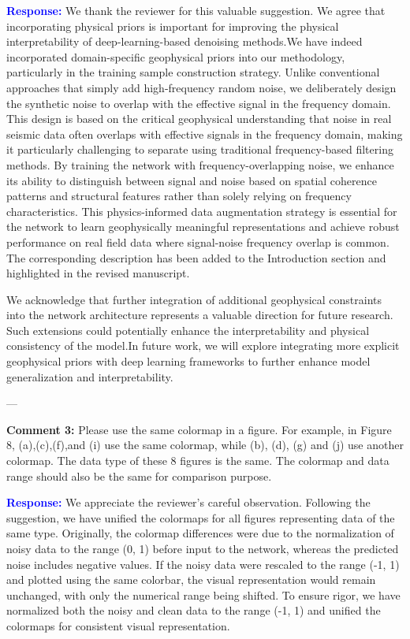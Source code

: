 \documentclass[12pt]{article}
\begin{document}
\textcolor{blue}{\textbf{Response:}}  
We thank the reviewer for this valuable suggestion. We agree that incorporating physical priors is important for improving the physical interpretability of deep-learning-based denoising methods.We have indeed incorporated domain-specific geophysical priors into our methodology, particularly in the training sample construction strategy. Unlike conventional approaches that simply add high-frequency random noise, we deliberately design the synthetic noise to overlap with the effective signal in the frequency domain. This design is based on the critical geophysical understanding that noise in real seismic data often overlaps with effective signals in the frequency domain, making it particularly challenging to separate using traditional frequency-based filtering methods. By training the network with frequency-overlapping noise, we enhance its ability to distinguish between signal and noise based on spatial coherence patterns and structural features rather than solely relying on frequency characteristics. This physics-informed data augmentation strategy is essential for the network to learn geophysically meaningful representations and achieve robust performance on real field data where signal-noise frequency overlap is common. The corresponding description has been added to the Introduction section and highlighted in the revised manuscript.

We acknowledge that further integration of additional geophysical constraints into the network architecture represents a valuable direction for future research. Such extensions could potentially enhance the interpretability and physical consistency of the model.In future work, we will explore integrating more explicit geophysical priors with deep learning frameworks to further enhance model generalization and interpretability.

---

\textbf{Comment 3:}  
Please use the same colormap in a figure. For example, in Figure 8, (a),(c),(f),and (i) use the same colormap, while (b), (d), (g) and (j) use another colormap. The data type of these 8 figures is the same. The colormap and data range should also be the same for comparison purpose.

\textcolor{blue}{\textbf{Response:}}  
We appreciate the reviewer’s careful observation. Following the suggestion, we have unified the colormaps for all figures representing data of the same type. Originally, the colormap differences were due to the normalization of noisy data to the range (0, 1) before input to the network, whereas the predicted noise includes negative values. If the noisy data were rescaled to the range (-1, 1) and plotted using the same colorbar, the visual representation would remain unchanged, with only the numerical range being shifted. To ensure rigor, we have normalized both the noisy and clean data to the range (-1, 1) and unified the colormaps for consistent visual representation.
\end{document}
